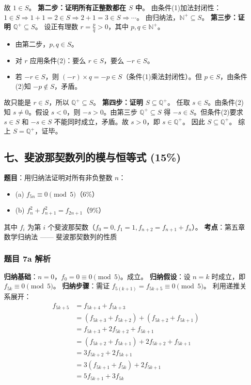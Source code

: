 \documentclass[10pt,a4paper,openany]{ctexbook}
\theoremstyle{definition}
\theoremstyle{remark}
\begin{document}
故 $1 \in S$。
\textbf{第二步：证明所有正整数都在 $S$ 中}。
由条件(1)加法封闭性：$1 \in S \Rightarrow 1 + 1 = 2 \in S \Rightarrow 2 + 1 = 3 \in S \Rightarrow \cdots$。
由归纳法，$\mathbb{N}^+ \subseteq S$。
\textbf{第三步：证明 $\mathbb{Q}^+ \subseteq S$}。
设正有理数 $r = \frac{p}{q} > 0$，其中 $p, q \in \mathbb{N}^+$。
\begin{itemize}
\item 由第二步，$p, q \in S$。
\item 对 $r$ 应用条件(2)：要么 $r \in S$，要么 $-r \in S$。
\item 若 $-r \in S$，则 $(-r) \times q = -p \in S$（条件(1)乘法封闭性）。但 $p \in S$，由条件(2)知 $-p \notin S$，矛盾。

\end{itemize}

故只能是 $r \in S$，所以 $\mathbb{Q}^+ \subseteq S$。
\textbf{第四步：证明 $S \subseteq \mathbb{Q}^+$}。
任取 $s \in S$。由条件(2)知 $s \neq 0$。假设 $s < 0$，则 $-s > 0$。由第三步 $\mathbb{Q}^+ \subseteq S$ 得 $-s \in S$。但条件(2)要求 $s \in S$ 和 $-s \in S$ 不能同时成立，矛盾。故 $s > 0$，即 $s \in \mathbb{Q}^+$。
因此 $S \subseteq \mathbb{Q}^+$。
综上 $S = \mathbb{Q}^+$，证毕。
\vspace{-2pt}

\subsection{七、斐波那契数列的模与恒等式 (15\%)}

\textbf{题目}：用归纳法证明对所有非负整数 $n$：
\begin{itemize}
\item (a) $f_{5n} \equiv 0 \pmod{5}$（6\%）
\item (b) $f_n^2 + f_{n+1}^2 = f_{2n+1}$（9\%）

\end{itemize}

其中 $f_i$ 为第 $i$ 个斐波那契数（$f_0 = 0, f_1 = 1, f_{n+2} = f_{n+1} + f_n$）。
\textbf{考点}：第五章 数学归纳法 —— 斐波那契数列的性质
\vspace{-2pt}

\subsubsection{题目 7a 解析}

\textbf{归纳基础}：$n = 0$，$f_0 = 0 \equiv 0 \pmod{5}$。成立。
\textbf{归纳假设}：设 $n = k$ 时成立，即 $f_{5k} \equiv 0 \pmod{5}$。
\textbf{归纳步骤}：需证 $f_{5(k+1)} = f_{5k+5} \equiv 0 \pmod{5}$。
利用递推关系展开：
\[
\begin{aligned}
f_{5k+5} &= f_{5k+4} + f_{5k+3} \\
&= (f_{5k+3} + f_{5k+2}) + (f_{5k+2} + f_{5k+1}) \\
&= f_{5k+3} + 2f_{5k+2} + f_{5k+1} \\
&= (f_{5k+2} + f_{5k+1}) + 2f_{5k+2} + f_{5k+1} \\
&= 3f_{5k+2} + 2f_{5k+1} \\
&= 3(f_{5k+1} + f_{5k}) + 2f_{5k+1} \\
&= 5f_{5k+1} + 3f_{5k}
\end{aligned}
\]
\end{document}
